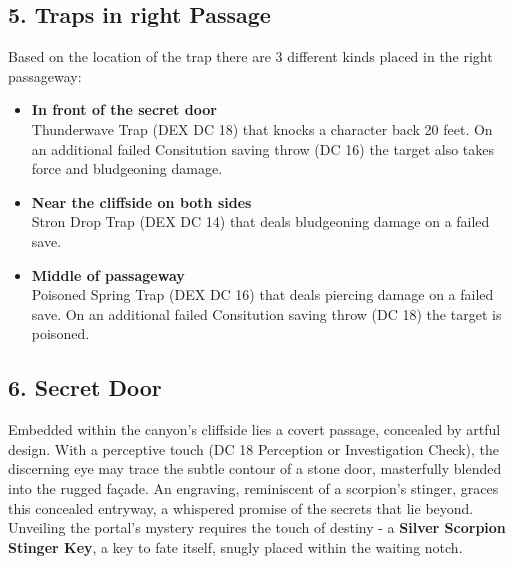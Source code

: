 \subsection*{5. Traps in right Passage}
{\entryfont
	Based on the location of the trap there are 3 different kinds placed in the right passageway:
	\begin{itemize}
		\item \textbf{In front of the secret door}\\
		Thunderwave Trap (DEX DC 18) that knocks a character back 20 feet. On an additional failed Consitution saving throw (DC 16) the target also takes  force and  bludgeoning damage.
		\item \textbf{Near the cliffside on both sides}\\
		Stron Drop Trap (DEX DC 14) that deals  bludgeoning damage on a failed save.
		\item \textbf{Middle of passageway}\\
		Poisoned Spring Trap (DEX DC 16) that deals  piercing damage on a failed save. On an additional failed Consitution saving throw (DC 18) the target is poisoned.
	\end{itemize}
}

\subsection*{6. Secret Door}
{\entryfont
	Embedded within the canyon's cliffside lies a covert passage, concealed by artful design. With a perceptive touch (DC 18 Perception or Investigation Check), the discerning eye may trace the subtle contour of a stone door, masterfully blended into the rugged façade. An engraving, reminiscent of a scorpion's stinger, graces this concealed entryway, a whispered promise of the secrets that lie beyond. Unveiling the portal's mystery requires the touch of destiny - a \textbf{Silver Scorpion Stinger Key}, a key to fate itself, snugly placed within the waiting notch.
}

